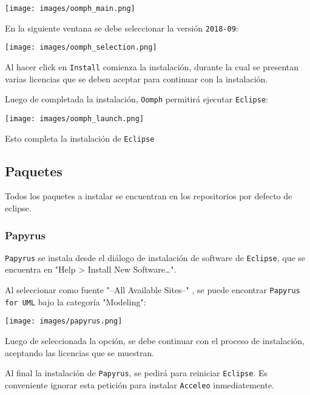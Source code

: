 \documentclass[11pt]{article}
\begin{document}
\begin{center}
\texttt{[image: images/oomph\_main.png]}
\end{center}

En la siguiente ventana se debe seleccionar la versión \texttt{2018-09}:

\begin{center}
\texttt{[image: images/oomph\_selection.png]}
\end{center}

Al hacer click en \texttt{Install} comienza la instalación, durante la cual
se presentan varias licencias que se deben aceptar para continuar con
la instalación.

Luego de completada la instalación, \texttt{Oomph} permitirá ejecutar \texttt{Eclipse}:

\begin{center}
\texttt{[image: images/oomph\_launch.png]}
\end{center}

Esto completa la instalación de \texttt{Eclipse}

\subsection{Paquetes}
\label{sec:org82d9ff1}

Todos los paquetes a instalar se encuentran en los repositorios por
defecto de eclipse.
\subsubsection{Papyrus}
\label{sec:orgedb7b37}
\texttt{Papyrus} se instala desde el diálogo de instalación de software de
\texttt{Eclipse}, que se encuentra en "Help > Install New Software\ldots{}".

Al seleccionar como fuente "--All Available Sites--" , se puede
encontrar \texttt{Papyrus for UML} bajo la categoría "Modeling":

\begin{center}
\texttt{[image: images/papyrus.png]}
\end{center}

Luego de seleccionada la opción, se debe continuar con el proceso de
instalación, aceptando las licencias que se muestran.

Al final la instalación de \texttt{Papyrus}, se pedirá para reiniciar
\texttt{Eclipse}. Es conveniente ignorar esta petición para instalar
\texttt{Acceleo} inmediatemente.
\end{document}
